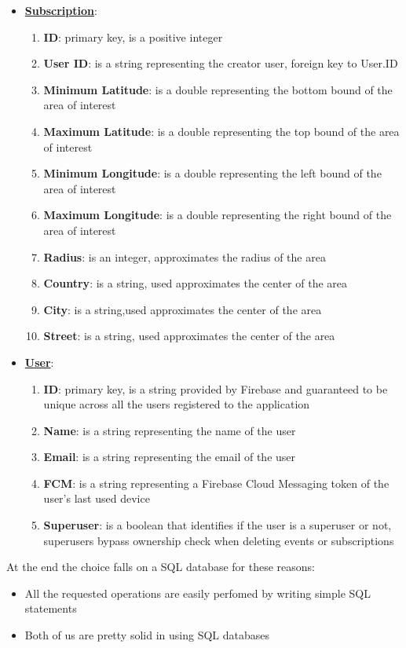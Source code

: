 \documentclass[a4paper]{scrreprt}
\begin{document}
\begin{itemize}
\item \underline{\textbf{Subscription}}:
\begin{enumerate}
\item \textbf{ID}: primary key, is a positive integer
\item \textbf{User ID}:  is a string representing the creator user, foreign key to User.ID
\item \textbf{Minimum Latitude}: is a double representing the bottom bound of the area of interest
\item \textbf{Maximum Latitude}: is a double representing the top bound of the area of interest
\item \textbf{Minimum Longitude}: is a double representing the left bound of the area of interest
\item \textbf{Maximum Longitude}: is a double representing the right bound of the area of interest
\item \textbf{Radius}: is an integer, approximates the radius of the area
\item \textbf{Country}: is a string, used approximates the center of the area
\item \textbf{City}:  is a string,used  approximates the center of the area
\item \textbf{Street}:  is a string, used approximates the center of the area
\end{enumerate}

\item \underline{\textbf{User}}:
\begin{enumerate}
\item \textbf{ID}: primary key, is a string provided by Firebase and guaranteed to be unique across all the users registered to the application
\item \textbf{Name}:  is a string representing the name of the user
\item \textbf{Email}: is a string representing the email of the user
\item \textbf{FCM}: is a string representing a Firebase Cloud Messaging token of the user's last used device
\item \textbf{Superuser}: is a boolean that identifies if the user is a superuser or not, superusers bypass ownership check when deleting events or subscriptions
\end{enumerate}
\end{itemize}

\par At the end the choice falls on a SQL database for these reasons:
\begin{itemize}
\item All the requested operations are easily perfomed by writing simple SQL statements
\item Both of us are pretty solid in using SQL databases
\end{itemize}
\end{document}
